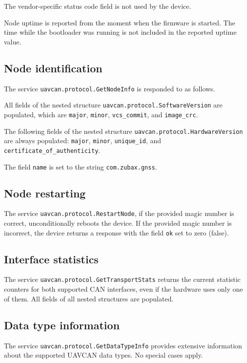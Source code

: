\documentclass{zubaxdoc}
\begin{document}
The vendor-specific status code field is not used by the device.

Node uptime is reported from the moment when the firmware is started.
The time while the bootloader was running is not included in the reported uptime value.

\subsection{Node identification}\label{sec:uavcan_node_identification}

The service \verb|uavcan.protocol.GetNodeInfo| is responded to as follows.

All fields of the nested structure \verb|uavcan.protocol.SoftwareVersion|
are populated, which are \verb|major|, \verb|minor|, \verb|vcs_commit|, and \verb|image_crc|.

The following fields of the nested structure \verb|uavcan.protocol.HardwareVersion|
are always populated: \verb|major|, \verb|minor|, \verb|unique_id|, and \verb|certificate_of_authenticity|.

The field \verb|name| is set to the string \verb|com.zubax.gnss|.

\subsection{Node restarting}

The service \verb|uavcan.protocol.RestartNode|, if the provided magic number is correct,
unconditionally reboots the device.
If the provided magic number is incorrect, the device returns a response with the field \verb|ok|
set to zero (false).

\subsection{Interface statistics}

The service \verb|uavcan.protocol.GetTransportStats| returns the current statistic counters
for both supported CAN interfaces, even if the hardware uses only one of them.
All fields of all nested structures are populated.

\subsection{Data type information}

The service \verb|uavcan.protocol.GetDataTypeInfo| provides extensive information about the
supported UAVCAN data types.
No special cases apply.
\end{document}
